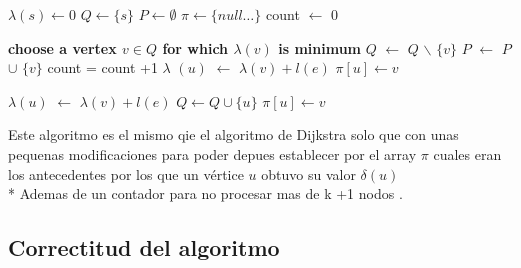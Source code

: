 \documentclass[10pt]{article}
\begin{document}
    
        \begin{algorithmic}[1]      
        \State $\lambda \left(s \right) \leftarrow 0 $
        \State $Q \leftarrow \{s\}$
        \State $P \leftarrow \emptyset $
        \State $\pi \leftarrow  \{null \dots\}$ 
        \State count $\leftarrow$ 0 

                \State \textbf{choose a vertex $v \in Q $ for which $\lambda \left(v\right)$ is minimum}
                \State $Q$ $\leftarrow$ $Q$ $\backslash$ $\{v\}$
                \State $P$ $\leftarrow$ $P$ $\cup$  $\{v\}$
                \State count = count +1 
                            \State $\lambda $ $\left(u\right)$ $\leftarrow $ $ \lambda \left(v\right) + l \left(e\right)$ 
                            \State $\pi \left[u\right]  \leftarrow v$
                        \EndIf
                        
                    \Else
                            \State $\lambda\left(u\right)$ $ \leftarrow $ $ \lambda \left(v\right) + l \left(e\right)$
                            \State $ Q \leftarrow  Q \cup \{u\}$
                            \State $\pi \left[u\right]  \leftarrow v$
                        \EndIf
                    \EndIf 
                \EndFor
        \EndWhile 
        \end{algorithmic}
    
        \vspace{0.5cm}

    \noindent Este algoritmo es el mismo qie el algoritmo de Dijkstra solo que con unas pequenas modificaciones para poder depues establecer por el array $\pi$ cuales eran los antecedentes por los que un v\'ertice $u$ obtuvo su valor $\delta\left(u\right)$ 
    \\*
    Ademas de un contador para no procesar mas de k +1  nodos .

    \subsection{Correctitud del algoritmo } 
\end{document}

